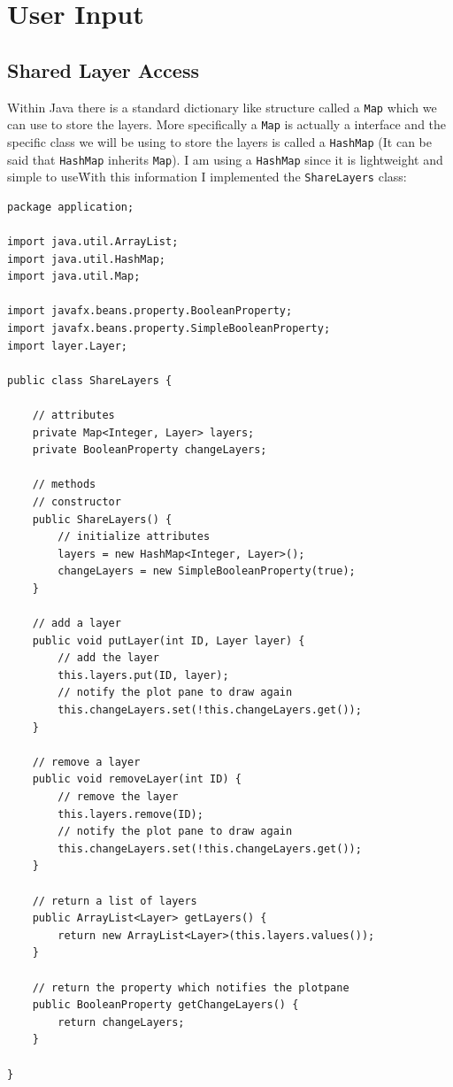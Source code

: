 \documentclass[../../../../main.tex]{subfiles}
\begin{document}
\section{User Input}
\subsection{Shared Layer Access}
Within Java there is a standard dictionary like structure called a \texttt{Map} which we can use to store the layers. More specifically a \texttt{Map}\cite{mapJava} is actually a interface and the specific class we will be using to store the layers is called a \texttt{HashMap}\cite{hashmapJava} (It can be said that \texttt{HashMap} inherits \texttt{Map}). I am using a \texttt{HashMap} since it is lightweight and simple to use\. With this information I implemented the \texttt{ShareLayers} class:
\begin{verbatim}
package application;

import java.util.ArrayList;
import java.util.HashMap;
import java.util.Map;

import javafx.beans.property.BooleanProperty;
import javafx.beans.property.SimpleBooleanProperty;
import layer.Layer;

public class ShareLayers {

	// attributes
	private Map<Integer, Layer> layers;
	private BooleanProperty changeLayers;

	// methods
	// constructor
	public ShareLayers() {
		// initialize attributes
		layers = new HashMap<Integer, Layer>();
		changeLayers = new SimpleBooleanProperty(true);
	}

	// add a layer
	public void putLayer(int ID, Layer layer) {
		// add the layer
		this.layers.put(ID, layer);
		// notify the plot pane to draw again
		this.changeLayers.set(!this.changeLayers.get());
	}

	// remove a layer
	public void removeLayer(int ID) {
		// remove the layer
		this.layers.remove(ID);
		// notify the plot pane to draw again
		this.changeLayers.set(!this.changeLayers.get());
	}

	// return a list of layers
	public ArrayList<Layer> getLayers() {
		return new ArrayList<Layer>(this.layers.values());
	}

	// return the property which notifies the plotpane
	public BooleanProperty getChangeLayers() {
		return changeLayers;
	}

}
\end{verbatim}
\end{document}
